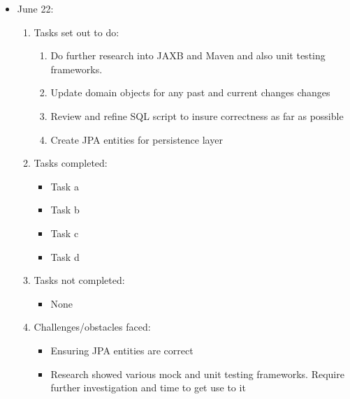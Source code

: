 	\begin{itemize}
		\item June 22:
		\begin{enumerate}
			\item Tasks set out to do:
			\begin{enumerate}
				\item Do further research into JAXB and Maven and also unit testing frameworks.
				\item Update domain objects for any past and current changes changes
				\item Review and refine SQL script to insure correctness as far as possible
				\item Create JPA entities for persistence layer
			\end{enumerate}
			\item Tasks completed:
			\begin{itemize}
				\item Task a
				\item Task b
				\item Task c
				\item Task d
			\end{itemize}
			\item Tasks not completed:
			\begin{itemize}
				\item None
			\end{itemize}
			\item Challenges/obstacles faced:
			\begin{itemize}
				\item Ensuring JPA entities are correct
				\item Research showed various mock and unit testing frameworks. Require further investigation and time to get use to it 
			\end{itemize}			
		\end{enumerate}
	\end{itemize}
	

